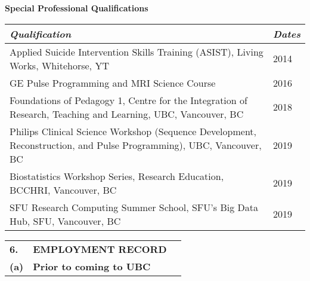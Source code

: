\documentclass[11pt,notitlepage,english]{report}
\begin{document}

\textbf{Special Professional Qualifications}

\begin{table}[h]
  \begin{tabularx}{1\textwidth}{|p{15.6cm}|X|}
    \hline
    \textit{Qualification}                                                                                                           & \textit{Dates} \\
    \hline
    Applied Suicide Intervention Skills Training (ASIST), Living Works, Whitehorse, YT                                               & 2014           \\
    \hline
    GE Pulse Programming and MRI Science Course                                                                                      & 2016           \\
    \hline
    Foundations of Pedagogy 1, Centre for the Integration of Research, Teaching and Learning, UBC, Vancouver, BC                     & 2018           \\
    \hline
    \raggedright Philips Clinical Science Workshop (Sequence Development, Reconstruction, and Pulse Programming), UBC, Vancouver, BC & 2019           \\
    \hline
    Biostatistics Workshop Series, Research Education, BCCHRI, Vancouver, BC                                                         & 2019           \\
    \hline
    SFU Research Computing Summer School, SFU's Big Data Hub, SFU, Vancouver, BC                                                         & 2019           \\
    \hline
  \end{tabularx}
\end{table}


\begin{tabular}{L{.5cm} L{8cm} L{6.9cm}}
  \textbf{6.}  & \textbf{EMPLOYMENT RECORD}      \\
  \textbf{(a)} & \textbf{Prior to coming to UBC} \\
\end{tabular}
\end{document}
